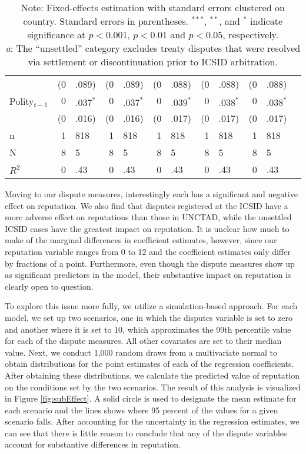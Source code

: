 \documentclass[12pt,onesided]{amsart}
\begin{document}
\begin{savenotes}
\begin{table}[ht]
\begin{tabular}{lr@{} lr@{}lr@{}lr@{}lr@{}lr@{}}
   & (0&.089) & (0&.089) & (0&.088) & (0&.088) & (0&.088) \\ 
  Polity$_{t-1}$ & $0$&$.037^{\ast}$ & $0$&$.037^{\ast}$ & $0$&$.039^{\ast}$ & $0$&$.038^{\ast}$ & $0$&$.038^{\ast}$ \\ 
   & (0&.016) & (0&.016) & (0&.017) & (0&.017) & (0&.017) \\ 
   \hline
n & 1&818 & 1&818 & 1&818 & 1&818 & 1&818 \\ 
  N & 8&5 & 8&5 & 8&5 & 8&5 & 8&5 \\ 
  $R^{2}$ & 0&.43 & 0&.43 & 0&.43 & 0&.43 & 0&.43 \\ 
   \hline\hline
\end{tabular}
\caption*{Note: Fixed-effects estimation with standard errors clustered on country. Standard errors in parentheses. $^{***}$, $^{**}$, and $^{*}$ indicate significance at $p<0.001$, $p<0.01$ and $p<0.05$, respectively. \\ \textit{a}: The ``unsettled'' category excludes treaty disputes that were resolved via settlement or discontinuation prior to ICSID arbitration.}
\end{table}
\end{savenotes}


Moving to our dispute measures, interestingly each has a significant and negative effect on reputation. We also find that disputes registered at the ICSID have a more adverse effect on reputations than those in UNCTAD, while the unsettled ICSID cases have the greatest impact on reputation. It is unclear how much to make of the marginal differences in coefficient estimates, however, since our reputation variable ranges from 0 to 12 and the coefficient estimates only differ by fractions of a point. Furthermore, even though the dispute measures show up as significant predictors in the model, their substantive impact on reputation is clearly open to question. 

To explore this issue more fully, we utilize a simulation-based approach. For each model, we set up two scenarios, one in which the disputes variable is set to zero and another where it is set to 10, which approximates the 99th percentile value for each of the dispute measures. All other covariates are set to their median value. Next, we conduct 1,000 random draws from a multivariate normal to obtain distributions for the point estimates of each of the regression coefficients. After obtaining these distributions, we calculate the predicted value of reputation on the conditions set by the two scenarios. The result of this analysis is visualized in Figure \ref{fig:subEffect}. A solid circle is used to designate the mean estimate for each scenario and the lines shows where 95 percent of the values for a given scenario falls. After accounting for the uncertainty in the regression estimates, we can see that there is little reason to conclude that any of the dispute variables account for substantive differences in reputation.
\end{document}

